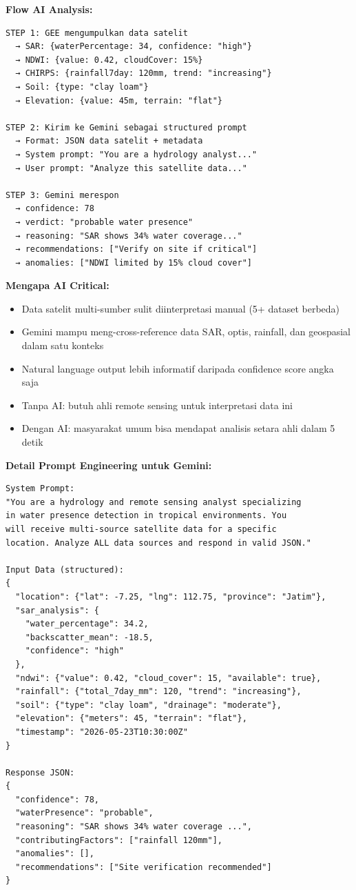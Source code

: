 \documentclass[12pt,a4paper]{article}
\newcommand{\subsectionbox}[1]{%
  \textbf{\large #1}\\[0.3cm]
}
\begin{document}
\subsectionbox{Flow AI Analysis:}

\begin{verbatim}
STEP 1: GEE mengumpulkan data satelit
  → SAR: {waterPercentage: 34, confidence: "high"}
  → NDWI: {value: 0.42, cloudCover: 15%}
  → CHIRPS: {rainfall7day: 120mm, trend: "increasing"}
  → Soil: {type: "clay loam"}
  → Elevation: {value: 45m, terrain: "flat"}

STEP 2: Kirim ke Gemini sebagai structured prompt
  → Format: JSON data satelit + metadata
  → System prompt: "You are a hydrology analyst..."
  → User prompt: "Analyze this satellite data..."

STEP 3: Gemini merespon
  → confidence: 78
  → verdict: "probable water presence"
  → reasoning: "SAR shows 34% water coverage..."
  → recommendations: ["Verify on site if critical"]
  → anomalies: ["NDWI limited by 15% cloud cover"]
\end{verbatim}

\subsectionbox{Mengapa AI Critical:}

\begin{itemize}
  \item Data satelit multi-sumber sulit diinterpretasi manual (5+ dataset berbeda)
  \item Gemini mampu meng-cross-reference data SAR, optis, rainfall, dan geospasial dalam satu konteks
  \item Natural language output lebih informatif daripada confidence score angka saja
  \item Tanpa AI: butuh ahli remote sensing untuk interpretasi data ini
  \item Dengan AI: masyarakat umum bisa mendapat analisis setara ahli dalam 5 detik
\end{itemize}

\subsectionbox{Detail Prompt Engineering untuk Gemini:}

\begin{verbatim}
System Prompt:
"You are a hydrology and remote sensing analyst specializing
in water presence detection in tropical environments. You
will receive multi-source satellite data for a specific
location. Analyze ALL data sources and respond in valid JSON."

Input Data (structured):
{
  "location": {"lat": -7.25, "lng": 112.75, "province": "Jatim"},
  "sar_analysis": {
    "water_percentage": 34.2,
    "backscatter_mean": -18.5,
    "confidence": "high"
  },
  "ndwi": {"value": 0.42, "cloud_cover": 15, "available": true},
  "rainfall": {"total_7day_mm": 120, "trend": "increasing"},
  "soil": {"type": "clay loam", "drainage": "moderate"},
  "elevation": {"meters": 45, "terrain": "flat"},
  "timestamp": "2026-05-23T10:30:00Z"
}

Response JSON:
{
  "confidence": 78,
  "waterPresence": "probable",
  "reasoning": "SAR shows 34% water coverage ...",
  "contributingFactors": ["rainfall 120mm"],
  "anomalies": [],
  "recommendations": ["Site verification recommended"]
}
\end{verbatim}
\end{document}
